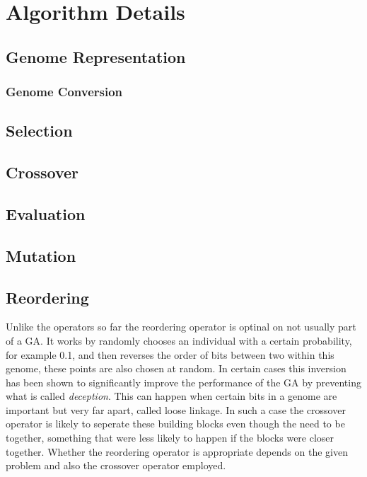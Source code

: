 \chapter{Algorithm Details}
\label{cha:algorithm_details}



\section{Genome Representation}
\label{sec:genome_representation}



\subsection{Genome Conversion}
\label{sec:genome_conversion}



\section{Selection} %
\label{sec:selection}



\section{Crossover} %
\label{sec:crossover}



\section{Evaluation} %
\label{sec:evaluation}



\section{Mutation} %
\label{sec:mutation}



\section{Reordering}
\label{sec:reordering}

Unlike the operators so far the reordering operator is optinal on not usually part of a GA. It works by randomly chooses an individual with a certain probability, for example 0.1, and then reverses the order of bits between two within this genome, these points are also chosen at random. In certain cases this inversion has been shown to significantly improve the performance of the GA by preventing what is called \textit{deception}\cite{8}. This can happen when certain bits in a genome are important but very far apart, called loose linkage. In such a case the crossover operator is likely to seperate these building blocks even though the need to be together, something that were less likely to happen if the blocks were closer together. Whether the reordering operator is appropriate depends on the given problem and also the crossover operator employed.
